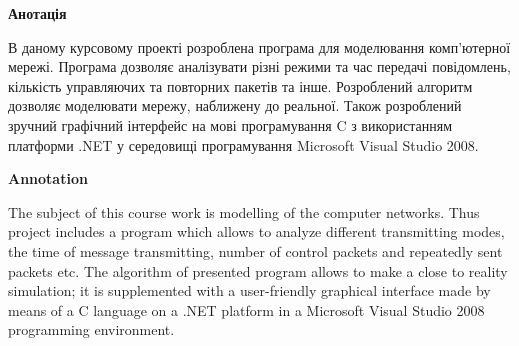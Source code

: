 \newpage
{}
\begin{center}
\textbf {Анотація}
\end{center} 

В даному курсовому проекті розроблена програма для моделювання комп'ютерної мережі. Програма дозволяє аналізувати різні режими та час передачі повідомлень, кількість управляючих та повторних пакетів та інше. Розроблений алгоритм дозволяє моделювати мережу, наближену до реальної. Також розроблений зручний графічний інтерфейс на мові програмування C з використанням платформи .NET у середовищі програмування Microsoft Visual Studio 2008.

\newpage
{}
\begin{center}
\textbf {Annotation}
\end{center} 

The subject of this course work is modelling of the computer networks. Thus project includes a program which allows to analyze different transmitting modes, the time of message transmitting, number of control packets and repeatedly sent packets etc. The algorithm of presented program allows to make a close to reality simulation; it is supplemented with a user-friendly graphical interface made by means of a C language on a .NET platform in a Microsoft Visual Studio 2008 programming environment.
\restoregeometry
\newpage
\setcounter{page}{1}

